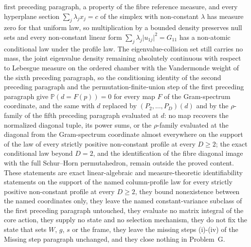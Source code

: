 first preceding paragraph, a property of the fibre reference measure, and every hyperplane section \(\sum_{j}\lambda_{j}x_{j}=c\) of the simplex with non-constant \(\lambda\) has measure zero for that uniform law, so multiplication by a bounded density preserves null sets and every non-constant linear form \(\sum_{j}\lambda_{j}\lvert u_{1j}\rvert^{2}=G_{11}\) has a non-atomic conditional law under the profile law. The eigenvalue-collision set still carries no mass, the joint eigenvalue density remaining absolutely continuous with respect to Lebesgue measure on the ordered chamber with the Vandermonde weight of the sixth preceding paragraph, so the conditioning identity of the second preceding paragraph and the permutation-finite-union step of the first preceding paragraph give \(\mathbb{P}(d=F(p))=0\) for every map \(F\) of the Gram-spectrum coordinate, and the same with \(d\) replaced by \((P_{2},\dots,P_{D})(d)\) and by the \(\rho\)-family of the fifth preceding paragraph evaluated at \(d\): no map recovers the normalized diagonal tuple, its power sums, or the \(\rho\)-family evaluated at the diagonal from the Gram-spectrum coordinate almost everywhere on the support of the law of every strictly positive non-constant profile at every \(D\ge2\); the exact conditional law beyond \(D=2\), and the identification of the fibre diagonal image with the full Schur--Horn permutahedron, remain outside the proved content. These statements are exact linear-algebraic and measure-theoretic identifiability statements on the support of the named column-profile law for every strictly positive non-constant profile at every \(D\ge2\), they bound nonexistence between the named coordinates only, they leave the named constant-variance subclass of the first preceding paragraph untouched, they evaluate no matrix integral of the core action, they supply no state and no selection mechanism, they do not fix the state that sets \(W\), \(g\), \(s\) or the frame, they leave the missing steps (i)-(iv) of the Missing step paragraph unchanged, and they close nothing in Problem~G.

